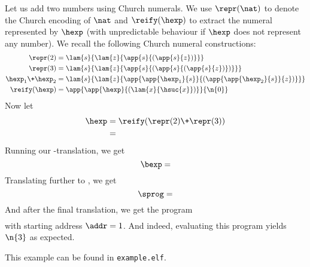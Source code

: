 Let us add two numbers using Church numerals.
We use $\repr(\nat)$ to denote the Church encoding of $\nat$ and $\reify(\hexp)$ to extract the numeral represented by $\hexp$ (with unpredictable behaviour if $\hexp$ does not represent any number).
We recall the following Church numeral constructions:
\begin{align*}
  \repr(2) &= \lam{s}{\lam{z}{\app{s}{(\app{s}{z})}}} \\
  \repr(3) &= \lam{s}{\lam{z}{\app{s}{(\app{s}{(\app{s}{z})})}}} \\
  \hexp_1 \+ \hexp_2 &= \lam{s}{\lam{z}{\app{\app{\hexp_1}{s}}{(\app{\app{\hexp_2}{s}}{z})}}} \\
  \reify(\hexp) &= \app{\app{\hexp}{(\lam{x}{\hsuc{x}})}}{\n{0}}
\end{align*}
Now let
\begin{align*}
  \hexp &= \reify(\repr(2) \+ \repr(3)) \\
  &= 
\end{align*}
Running our \hlang-\blang translation, we get
\[
\bexp = 
\]
Translating further to \slang, we get
\[
\sprog = 
\]
And after the final translation, we get the \mlang program
\begin{align*}

\end{align*}
with starting address $\addr = 1$.
And indeed, evaluating this program yields $\n{3}$ as expected.

\Twelf
This example can be found in \texttt{example.elf}.
